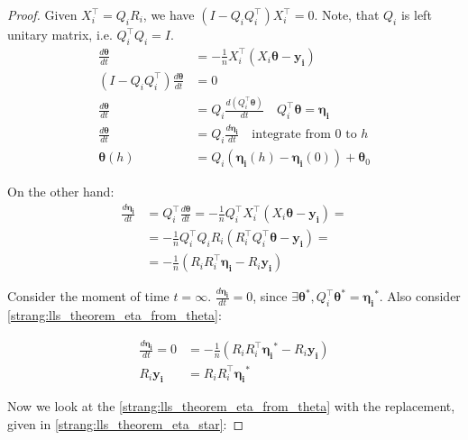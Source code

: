 \documentclass{article}
\newcommand{\vect}[1]{\boldsymbol{\mathbf{#1}}}
\begin{document}
\begin{proof}
Given $X_i^\top = Q_i R_i$, we have $(I - Q_iQ_i^\top)X_i^\top = 0$. Note, that $Q_i$ is left unitary matrix, i.e. $Q_i^\top Q_i = I$. 
\begin{align}
\nonumber \frac{d \vect{\theta}}{d t} &= - \frac{1}{n}X_i^\top(X_i \vect{\theta} - \vect{y_i}) \\
\nonumber (I - Q_iQ_i^\top)\frac{d \vect{\theta}}{d t} &= 0 \\
\nonumber \frac{d \vect{\theta}}{d t} &= Q_i\frac{d (Q_i^\top\vect{\theta})}{d t} \quad Q_i^\top \vect{\theta} = \vect{\eta_i}\\ 
\nonumber \frac{d \vect{\theta}}{d t} &= Q_i\frac{d \vect{\eta_i}}{d t} \quad \text{integrate from $0$ to $h$}\\ 
\label{strang:lls_theorem_theta_from_eta}\vect{\theta}(h) &= Q_i \left(\vect{\eta_i}(h) - \vect{\eta_i}(0) \right) + \vect{\theta}_0
\end{align}

On the other hand:
\begin{align}\nonumber
\frac{d \vect{\eta_i}}{d t} &= Q_i^\top\frac{d \vect{\theta}}{d t} =  - \frac{1}{n} Q_i^\top X_i^\top(X_i \vect{\theta} - \vect{y_i}) = \\ 
\nonumber&= - \frac{1}{n} Q_i^\top  Q_i R_i( R_i^\top Q_i^\top \vect{\theta} - \vect{y_i}) =\\
&= - \frac{1}{n} \left( R_iR_i^\top \vect{\eta_i} - R_i \vect{y_i}\right) \label{strang:lls_theorem_eta_from_theta}
\end{align}

Consider the moment of time $t = \infty$. $\frac{d \vect{\eta_i}}{d t} = 0$, since $\exists \vect{\theta}^*, Q_i^\top \vect{\theta}^* = \vect{\eta_i}^*$. Also consider \eqref{strang:lls_theorem_eta_from_theta}:

\begin{equation}\label{strang:lls_theorem_eta_star}
\begin{split}
\frac{d \vect{\eta_i}}{d t} = 0 &= - \frac{1}{n} \left( R_iR_i^\top \vect{\eta_i}^* - R_i \vect{y_i}\right) \\ R_i \vect{y_i} &= R_iR_i^\top \vect{\eta_i}^*
\end{split}
\end{equation}

Now we look at the \eqref{strang:lls_theorem_eta_from_theta} with the replacement, given in \eqref{strang:lls_theorem_eta_star}:


\end{proof}
\end{document}

